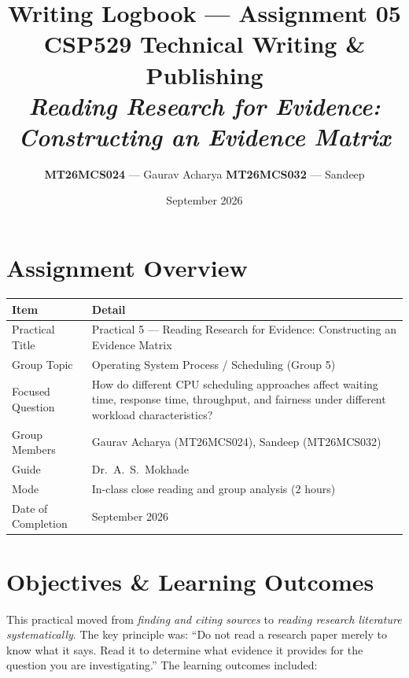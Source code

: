 \documentclass[11pt, a4paper]{article}
\title{
    \vspace{-1cm}
    \textbf{Writing Logbook --- Assignment 05} \\[0.3em]
    \large CSP529 Technical Writing \& Publishing \\[0.2em]
    \large \textit{Reading Research for Evidence: Constructing an Evidence Matrix}
}
\author{
    \textbf{MT26MCS024} --- Gaurav Acharya \quad
    \textbf{MT26MCS032} --- Sandeep
}
\date{September 2026}
\begin{document}
\maketitle
\thispagestyle{fancy}

\section{Assignment Overview}

\begin{tabular}{@{}p{4.5cm} p{10cm}@{}}
    \toprule
    \textbf{Item} & \textbf{Detail} \\
    \midrule
    Practical Title & Practical 5 --- Reading Research for Evidence: Constructing an Evidence Matrix \\
    Group Topic & Operating System Process / Scheduling (Group 5) \\
    Focused Question & How do different CPU scheduling approaches affect waiting time, response time, throughput, and fairness under different workload characteristics? \\
    Group Members & Gaurav Acharya (MT26MCS024), Sandeep (MT26MCS032) \\
    Guide & Dr.\ A.\ S.\ Mokhade \\
    Mode & In-class close reading and group analysis (2 hours) \\
    Date of Completion & September 2026 \\
    \bottomrule
\end{tabular}

\section{Objectives \& Learning Outcomes}

This practical moved from \emph{finding and citing sources} to \emph{reading research literature systematically}. The key principle was: ``Do not read a research paper merely to know what it says. Read it to determine what evidence it provides for the question you are investigating.'' The learning outcomes included:
\end{document}
